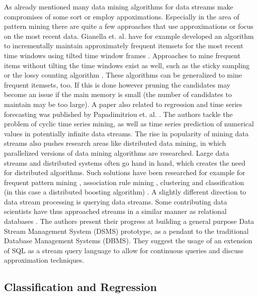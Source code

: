 As already mentioned many data mining algorithms for data streams make compromises of some sort or employ appoximations. Especially in the area of pattern mining there are quite a few approaches that use approximations or focus on the most recent data. Gianella et. al. have for example developed an algorithm to incrementally maintain approximately frequent itemsets for the most recent time windows using tilted time window frames \cite{giannella2003mining}. Approaches to mine frequent items without tilting the time windows exist as well, such as the sticky sampling or the lossy counting algorithm \cite{manku2002approximate}. These algorithms can be generalized to mine frequent itemsets, too. If this is done however pruning the candidates may become an issue if the main memory is small (the number of candidates to maintain may be too large). \newline
A paper also related to regression and time series forecasting was published by Papadimitriou et. al. \cite{papadimitriou2003adaptive}. The authors tackle the problem of cyclic time series mining, as well as time series prediction of numerical values in potentially infinite data streams. \newline
The rise in popularity of mining data streams also pushes research areas like distributed data mining, in which parallelized versions of data mining algorithms are researched. Large data streams and distributed systems often go hand in hand, which creates the need for distributed algorithms. Such solutions have been researched for example for frequent pattern mining \cite{lin2015fast}, association rule mining \cite{ashrafi2004odam}, clustering \cite{januzaj2004dbdc} and classification (in this case a distributed boosting algorithm) \cite{lazarevic2001distributed}. \newline
A slightly different direction to data stream processing is querying data streams. Some contributing data scientists have thus approached streams in a similar manner as relational databases \cite{motwani2003query}. The authors present their progress at building a general purpose Data Stream Management System (DSMS) prototype, as a pendant to the traditional Database Management Systems (DBMS). They suggest the usage of an extension of SQL as a stream query language to allow for continuous queries and discuss approximation techniques. 


\subsection{Classification and Regression}
\label{subsec_regression}

